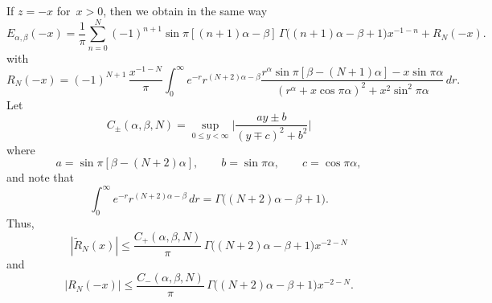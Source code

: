 \documentclass[12pt,a4paper]{article}
\begin{document}
If $z=-x$ for~$x>0$, then we obtain in the same way
\begin{equation}\label{eq: E minus asymptotic}
E_{\alpha,\beta}(-x)=\frac{1}{\pi}\sum_{n=0}^N(-1)^{n+1}
    \sin\pi[(n+1)\alpha-\beta]\,\Gamma\bigl((n+1)\alpha-\beta+1\bigr)x^{-1-n}
    +R_N(-x).
\end{equation}
with
\[
R_N(-x)=(-1)^{N+1}\,\frac{x^{-1-N}}{\pi}\int_0^\infty 
    e^{-r}r^{(N+2)\alpha-\beta}
    \frac{r^\alpha\sin\pi[\beta-(N+1)\alpha]-x\sin\pi\alpha}%
{(r^\alpha+x\cos\pi\alpha)^2+x^2\sin^2\pi\alpha}\,dr.
\]
Let
\begin{equation}\label{eq: Cpm}
C_\pm(\alpha, \beta, N)=\sup_{0\le y<\infty}
    \biggl|\frac{ay\pm b}{(y\mp c)^2+b^2}\biggr|
\end{equation}
where
\begin{equation}\label{eq: A B C}
a=\sin\pi[\beta-(N+2)\alpha],\qquad b=\sin\pi\alpha,\qquad c=\cos\pi\alpha,
\end{equation}
and note that
\[
\int_0^\infty e^{-r}r^{(N+2)\alpha-\beta}\,dr
    =\Gamma\bigl((N+2)\alpha-\beta+1\bigr).
\]
Thus,
\[
|\tilde R_N(x)|\le\frac{C_+(\alpha,\beta,N)}{\pi}\,
    \Gamma\bigl((N+2)\alpha-\beta+1\bigr)x^{-2-N}
\]
and
\[
|R_N(-x)|\le\frac{C_-(\alpha,\beta,N)}{\pi}\,
    \Gamma\bigl((N+2)\alpha-\beta+1\bigr)x^{-2-N}.
\]
\end{document}

